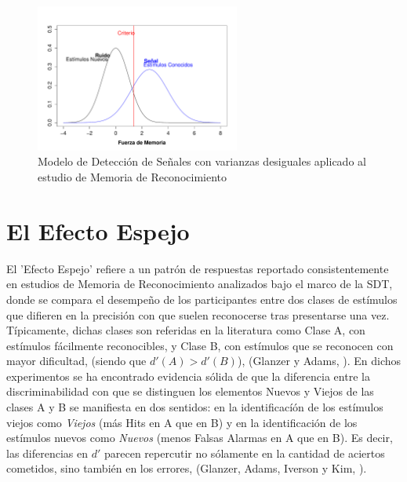 \begin{figure}[th]
\centering
\includegraphics[width=0.60\textwidth]{Figures/RM_SDT_2} 
\decoRule
\caption[SDT en Memoria de Reconocimiento (Varianzas Desiguales)]{Modelo de Detección de Señales con varianzas desiguales aplicado al estudio de Memoria de Reconocimiento}
\label{fig:RM_SDT_2}
\end{figure}














\section{El Efecto Espejo}

El 'Efecto Espejo' refiere a un patrón de respuestas reportado consistentemente en estudios de Memoria de Reconocimiento analizados bajo el marco de la SDT, donde se compara el desempeño de los participantes entre dos clases de estímulos que difieren en la precisión con que suelen reconocerse tras presentarse una vez. Típicamente, dichas clases son referidas en la literatura como Clase A, con estímulos fácilmente reconocibles, y Clase B, con estímulos que se reconocen con mayor dificultad, (siendo que $d'(A) > d'(B)$), (Glanzer y Adams, \citeyear{Glanzer1990}). En dichos experimentos se ha encontrado evidencia sólida de que la diferencia entre la discriminabilidad con que se distinguen los elementos Nuevos y Viejos de las clases A y B se manifiesta en dos sentidos: en la identificacíón de los estímulos viejos como \textit{Viejos} (más Hits en A que en B) y en la identificación de los estímulos nuevos como \textit{Nuevos} (menos Falsas Alarmas en A que en B). Es decir, las diferencias en $d'$ parecen repercutir no sólamente en la cantidad de aciertos cometidos, sino también en los errores, (Glanzer, Adams, Iverson y Kim, \citeyear{Glanzer1993}).\\


